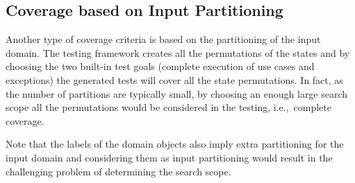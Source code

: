 \subsection{Coverage based on Input Partitioning}
\label{sec:case-study-partitioning-coverage}
Another type of coverage criteria is based on the partitioning of the input domain. The testing framework creates all the permutations of the states and by choosing the two built-in test goals (complete execution of use cases and exceptions) the generated tests will cover all the state permutations. In fact, as the number of partitions are typically small, by choosing an enough large search scope all the permutations would be considered in the testing, i.e.,\ complete coverage.

Note that the labels of the domain objects also imply extra partitioning for the input domain and considering them as input partitioning would result in the challenging problem of determining the search scope.